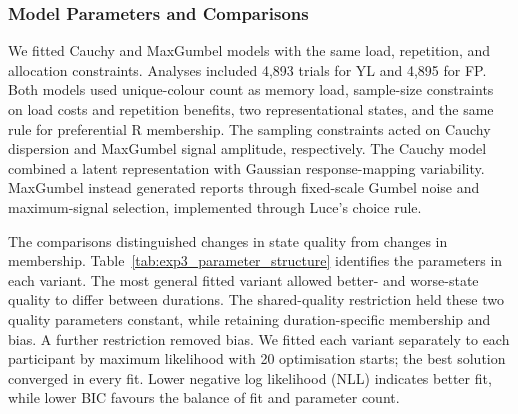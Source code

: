 
\subsubsection{Model Parameters and Comparisons}

We fitted Cauchy and MaxGumbel models with the same load, repetition, and allocation constraints. Analyses included 4,893 trials for YL and 4,895 for FP. Both models used unique-colour count as memory load, sample-size constraints on load costs and repetition benefits, two representational states, and the same rule for preferential R membership. The sampling constraints acted on Cauchy dispersion and MaxGumbel signal amplitude, respectively. The Cauchy model combined a latent representation with Gaussian response-mapping variability. MaxGumbel instead generated reports through fixed-scale Gumbel noise and maximum-signal selection, implemented through Luce's choice rule.

The comparisons distinguished changes in state quality from changes in membership. Table~\ref{tab:exp3_parameter_structure} identifies the parameters in each variant. The most general fitted variant allowed better- and worse-state quality to differ between durations. The shared-quality restriction held these two quality parameters constant, while retaining duration-specific membership and bias. A further restriction removed bias. We fitted each variant separately to each participant by maximum likelihood with 20 optimisation starts; the best solution converged in every fit. Lower negative log likelihood (NLL) indicates better fit, while lower BIC favours the balance of fit and parameter count.

